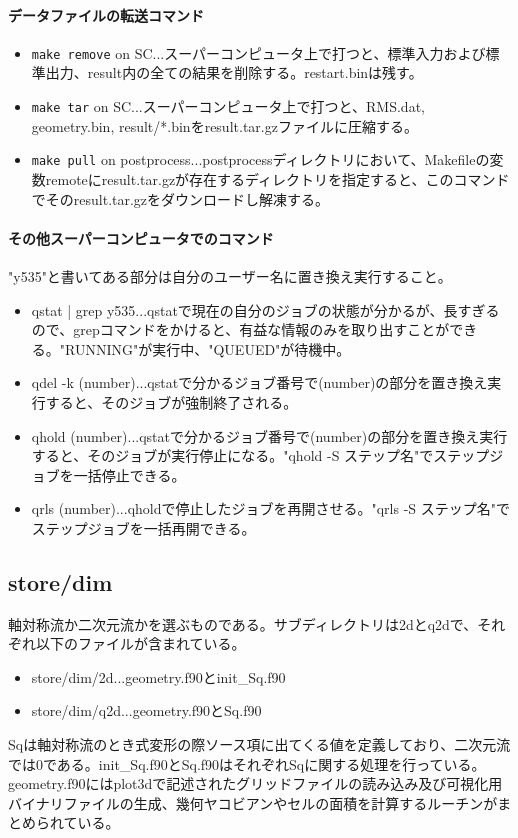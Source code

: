 \documentclass{jsarticle}
\begin{document}
\paragraph{データファイルの転送コマンド}
\begin{itemize}
\item \verb|make remove| on SC...スーパーコンピュータ上で打つと、標準入力および標準出力、result内の全ての結果を削除する。restart.binは残す。
\item \verb|make tar| on SC...スーパーコンピュータ上で打つと、RMS.dat, geometry.bin, result/*.binをresult.tar.gzファイルに圧縮する。
\item \verb|make pull| on postprocess...postprocessディレクトリにおいて、Makefileの変数remoteにresult.tar.gzが存在するディレクトリを指定すると、このコマンドでそのresult.tar.gzをダウンロードし解凍する。
\end{itemize}

\paragraph{その他スーパーコンピュータでのコマンド}
"y535"と書いてある部分は自分のユーザー名に置き換え実行すること。
\begin{itemize}
\item qstat | grep y535...qstatで現在の自分のジョブの状態が分かるが、長すぎるので、grepコマンドをかけると、有益な情報のみを取り出すことができる。"RUNNING"が実行中、"QUEUED"が待機中。
\item qdel -k (number)...qstatで分かるジョブ番号で(number)の部分を置き換え実行すると、そのジョブが強制終了される。
\item qhold (number)...qstatで分かるジョブ番号で(number)の部分を置き換え実行すると、そのジョブが実行停止になる。"qhold -S ステップ名"でステップジョブを一括停止できる。
\item qrls (number)...qholdで停止したジョブを再開させる。"qrls -S ステップ名"でステップジョブを一括再開できる。
\end{itemize}
\subsection{store/dim}%
軸対称流か二次元流かを選ぶものである。サブディレクトリは2dとq2dで、それぞれ以下のファイルが含まれている。
\begin{itemize}
\item store/dim/2d...geometry.f90とinit\_Sq.f90
\item store/dim/q2d...geometry.f90とSq.f90
\end{itemize}
Sqは軸対称流のとき式変形の際ソース項に出てくる値を定義しており、二次元流では0である。init\_Sq.f90とSq.f90はそれぞれSqに関する処理を行っている。
geometry.f90にはplot3dで記述されたグリッドファイルの読み込み及び可視化用バイナリファイルの生成、幾何ヤコビアンやセルの面積を計算するルーチンがまとめられている。
\end{document}

